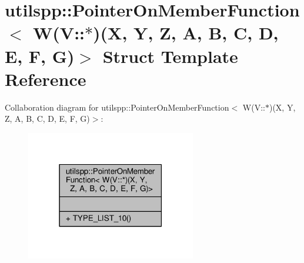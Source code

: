 \hypertarget{structutilspp_1_1PointerOnMemberFunction_3_01W_07V_1_1_5_08_07X_00_01Y_00_01Z_00_01A_00_01B_00_052975cfd5a0b2be63fce3f8de7f60f64}{\section{utilspp\-:\-:Pointer\-On\-Member\-Function$<$ W(V\-:\-:$\ast$)(X, Y, Z, A, B, C, D, E, F, G)$>$ Struct Template Reference}
\label{structutilspp_1_1PointerOnMemberFunction_3_01W_07V_1_1_5_08_07X_00_01Y_00_01Z_00_01A_00_01B_00_052975cfd5a0b2be63fce3f8de7f60f64}
}


Collaboration diagram for utilspp\-:\-:Pointer\-On\-Member\-Function$<$ W(V\-:\-:$\ast$)(X, Y, Z, A, B, C, D, E, F, G)$>$\-:
\nopagebreak
\begin{figure}[H]
\begin{center}
\leavevmode
\includegraphics[width=210pt]{structutilspp_1_1PointerOnMemberFunction_3_01W_07V_1_1_5_08_07X_00_01Y_00_01Z_00_01A_00_01B_00_05dd793f3dd7762f26c9b228bf6e07387}
\end{center}
\end{figure}
